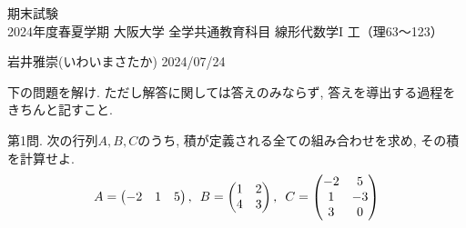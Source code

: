 \documentclass[dvipdfmx,a4paper,11pt]{article}
\theoremstyle{definition}
\begin{document}
\pagestyle{empty}



\begin{center}
{\LARGE 期末試験} \\

{2024年度春夏学期 大阪大学 全学共通教育科目 線形代数学I 工（理63〜123）}
\end{center}

\begin{flushright}
 岩井雅崇(いわいまさたか) 2024/07/24
\end{flushright}



  
  \begin{center}
下の問題を解け.  ただし解答に関しては答えのみならず, 答えを導出する過程をきちんと記すこと. 
  \end{center}
  
   \vspace{11pt}
{\Large 第1問.} 
次の行列$A,B,C$のうち, 積が定義される全ての組み合わせを求め, その積を計算せよ.
 $$
  A=\begin{pmatrix} %
 -2& 1&5 \\
 \end{pmatrix} 
 \text{, \,\,} 
B= \begin{pmatrix} %
 1& 2 \\
 4 & 3   \\
 \end{pmatrix} %
 \text{, \,\,} 
 C=
  \begin{pmatrix}
 -2 &5 \\
1 &-3 \\
3&0  \\
 \end{pmatrix}
 $$
  
  
\end{document}
